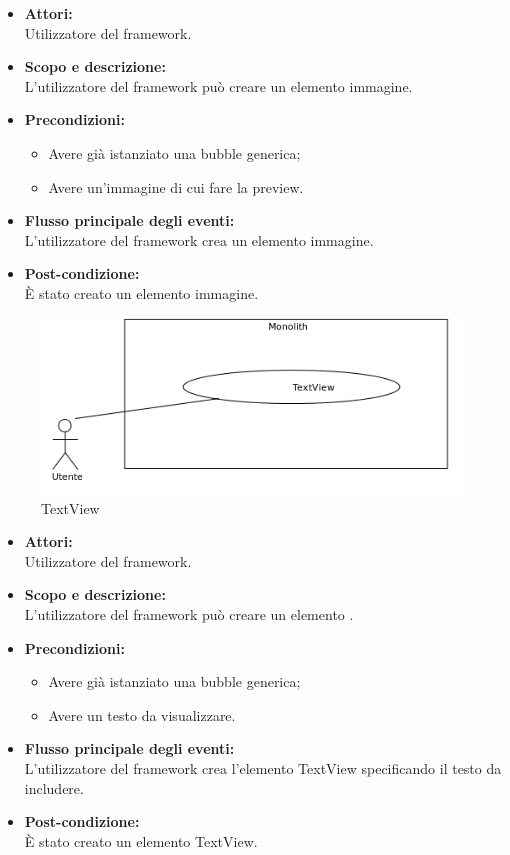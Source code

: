 \begin{itemize}
	\item \textbf{Attori:}
	\\Utilizzatore del framework.
	\item \textbf{Scopo e descrizione:} 
	\\L'utilizzatore del framework può creare un elemento immagine.
	\item \textbf{Precondizioni:}
	\begin{itemize}
		\item Avere già istanziato una bubble generica;
		\item Avere un'immagine di cui fare la preview.
	\end{itemize}
	\item \textbf{Flusso principale degli eventi:}
	\\L'utilizzatore del framework crea un elemento immagine.
	\item \textbf{Post-condizione:}
	\\È stato creato un elemento immagine.
\end{itemize}

\begin{samepage}
\nopagebreak
\begin{figure}[H]
	\centering
	\includegraphics[width=15cm]{../../documenti/AnalisiDeiRequisiti/Diagrammi_img/uc1_26.png}
	\caption{\UCFFCaption{} TextView}
\end{figure}
\end{samepage}

\begin{itemize}
	\item \textbf{Attori:}
	\\Utilizzatore del framework.
	\item \textbf{Scopo e descrizione:} 
	\\L'utilizzatore del framework può creare un elemento .
	\item \textbf{Precondizioni:}
	\begin{itemize}
		\item Avere già istanziato una bubble generica;
		\item Avere un testo da visualizzare.
	\end{itemize}
	\item \textbf{Flusso principale degli eventi:}
	\\L'utilizzatore del framework crea l'elemento TextView specificando il testo da includere.
	\item \textbf{Post-condizione:}
	\\È stato creato un elemento TextView.
\end{itemize}

